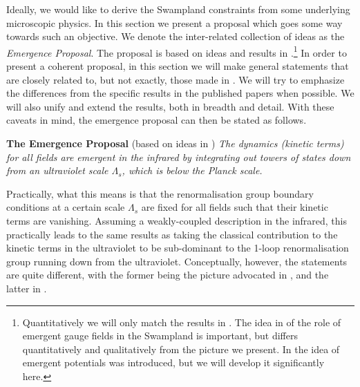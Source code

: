 \documentclass[11pt,a4paper]{article}
\numberwithin{equation}{section}
\numberwithin{table}{section}\setlength{\multlinegap}{25pt}
\begin{document}
{Ideally, we would like to derive the Swampland constraints from some underlying microscopic physics. In this section we present a proposal which goes some way towards such an objective. We denote the inter-related collection of ideas as the {\it Emergence Proposal}. The proposal is based on ideas and results in \cite{Harlow:2015lma,Heidenreich:2017sim,Grimm:2018ohb,Heidenreich:2018kpg,Ooguri:2018wrx}.\footnote{Quantitatively we will only match the results in \cite{Heidenreich:2017sim,Grimm:2018ohb,Heidenreich:2018kpg}. The idea in \cite{Harlow:2015lma} of the role of emergent gauge fields in the Swampland is important, but differs quantitatively and qualitatively from the picture we present. In \cite{Ooguri:2018wrx} the idea of emergent potentials was introduced, but we will develop it significantly here.} In order to present a coherent proposal, in this section we will make general statements that are closely related to, but not exactly, those made in \cite{Harlow:2015lma,Heidenreich:2017sim,Grimm:2018ohb,Heidenreich:2018kpg,Ooguri:2018wrx}. We will try to emphasize the differences from the specific results in the published papers when possible. We will also unify and extend the results, both in breadth and detail. With these caveats in mind, the emergence proposal can then be stated as follows. 
\begin{tcolorbox}
{\bf The Emergence Proposal } \;(based on ideas in \cite{Harlow:2015lma,Heidenreich:2017sim,Grimm:2018ohb,Heidenreich:2018kpg,Ooguri:2018wrx})
\newline
\newline
{\it 
The dynamics (kinetic terms) for all fields are emergent in the infrared by integrating out towers of states down from an ultraviolet scale $\Lambda_s$, which is below the Planck scale.
}
\end{tcolorbox}
Practically, what this means is that the renormalisation group boundary conditions at a certain scale $\Lambda_s$ are fixed for all fields such that their kinetic terms are vanishing. Assuming a weakly-coupled description in the infrared, this practically leads to the same results as taking the classical contribution to the kinetic terms in the ultraviolet to be sub-dominant to the 1-loop renormalisation group running down from the ultraviolet. Conceptually, however, the statements are quite different, with the former being the picture advocated in \cite{Harlow:2015lma,Grimm:2018ohb}, and the latter in \cite{Heidenreich:2017sim,Heidenreich:2018kpg}.

}
\end{document}
